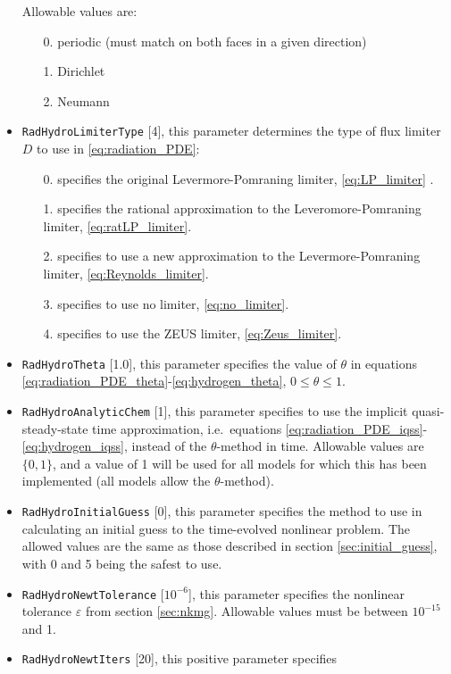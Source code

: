 \documentclass[letterpaper,10pt]{article}
\renewcommand{\(}{\left(}
\renewcommand{\)}{\right)}
\begin{document}
\begin{itemize}
  Allowable values are:
  \begin{itemize}
  \item[0.] periodic (must match on both faces in a given direction)
  \item[1.] Dirichlet
  \item[2.] Neumann
  \end{itemize}
\item {\tt RadHydroLimiterType} [4], this parameter determines the
  type of flux limiter $D$ to use in \eqref{eq:radiation_PDE}:
  \begin{itemize}
  \item[0.] specifies the original Levermore-Pomraning limiter,
    \eqref{eq:LP_limiter} \cite{Levermore1984,LevermorePomraning1981}.
  \item[1.] specifies the rational approximation to the
    Leveromore-Pomraning limiter, \eqref{eq:ratLP_limiter}.
  \item[2.] specifies to use a new approximation to the
    Levermore-Pomraning limiter, \eqref{eq:Reynolds_limiter}.
  \item[3.] specifies to use no limiter, \eqref{eq:no_limiter}.
  \item[4.] specifies to use the ZEUS limiter, \eqref{eq:Zeus_limiter}.
  \end{itemize}
\item {\tt RadHydroTheta} [1.0], this parameter specifies the
  value of $\theta$ in equations
  \eqref{eq:radiation_PDE_theta}-\eqref{eq:hydrogen_theta},
  $0\le\theta\le 1$.
\item {\tt RadHydroAnalyticChem} [1], this parameter specifies to use
  the implicit quasi-steady-state time approximation, i.e.~equations
  \eqref{eq:radiation_PDE_iqss}-\eqref{eq:hydrogen_iqss}, instead of
  the $\theta$-method in time.  Allowable values are $\{0,1\}$, and a
  value of 1 will be used for all models for which this has been
  implemented (all models allow the $\theta$-method).
\item {\tt RadHydroInitialGuess} [0], this parameter specifies the
  method to use in calculating an initial guess to the time-evolved
  nonlinear problem.  The allowed values are the same as those
  described in section \ref{sec:initial_guess}, with 0 and 5 being the
  safest to use.
\item {\tt RadHydroNewtTolerance} [$10^{-6}$], this parameter
  specifies the nonlinear tolerance $\varepsilon$ from section
  \ref{sec:nkmg}.  Allowable values must be between $10^{-15}$ and 1.
\item {\tt RadHydroNewtIters} [20], this positive parameter specifies

\end{itemize}
\end{document}
